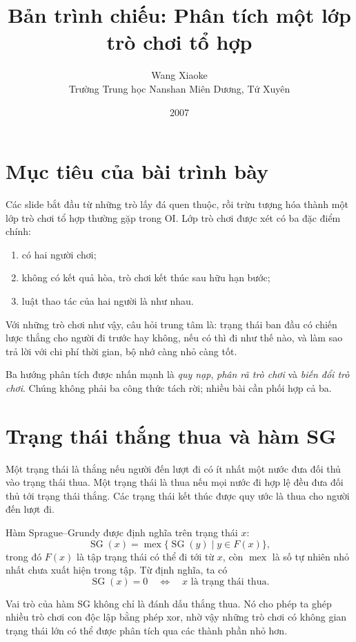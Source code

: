\documentclass[11pt]{article}
\title{Bản trình chiếu: Phân tích một lớp trò chơi tổ hợp}
\author{Wang Xiaoke\\Trường Trung học Nanshan Miên Dương, Tứ Xuyên}
\date{2007}
\newcommand{\SG}{\operatorname{SG}}
\newcommand{\mex}{\operatorname{mex}}
\begin{document}
\maketitle


\section{Mục tiêu của bài trình bày}

Các slide bắt đầu từ những trò lấy đá quen thuộc, rồi trừu tượng hóa thành
một lớp trò chơi tổ hợp thường gặp trong OI. Lớp trò chơi được xét có ba đặc
điểm chính:
\begin{enumerate}
  \item có hai người chơi;
  \item không có kết quả hòa, trò chơi kết thúc sau hữu hạn bước;
  \item luật thao tác của hai người là như nhau.
\end{enumerate}

Với những trò chơi như vậy, câu hỏi trung tâm là: trạng thái ban đầu có chiến
lược thắng cho người đi trước hay không, nếu có thì đi như thế nào, và làm sao
trả lời với chi phí thời gian, bộ nhớ càng nhỏ càng tốt.

Ba hướng phân tích được nhấn mạnh là \emph{quy nạp}, \emph{phân rã trò chơi}
và \emph{biến đổi trò chơi}. Chúng không phải ba công thức tách rời; nhiều bài
cần phối hợp cả ba.

\section{Trạng thái thắng thua và hàm SG}

Một trạng thái là thắng nếu người đến lượt đi có ít nhất một nước đưa đối thủ
vào trạng thái thua. Một trạng thái là thua nếu mọi nước đi hợp lệ đều đưa đối
thủ tới trạng thái thắng. Các trạng thái kết thúc được quy ước là thua cho
người đến lượt đi.

Hàm Sprague--Grundy được định nghĩa trên trạng thái \(x\):
\[
  \SG(x)=\mex\{\SG(y)\mid y\in F(x)\},
\]
trong đó \(F(x)\) là tập trạng thái có thể đi tới từ \(x\), còn \(\mex\) là số
tự nhiên nhỏ nhất chưa xuất hiện trong tập. Từ định nghĩa, ta có
\[
  \SG(x)=0 \quad\Longleftrightarrow\quad x\text{ là trạng thái thua}.
\]

Vai trò của hàm SG không chỉ là đánh dấu thắng thua. Nó cho phép ta ghép nhiều
trò chơi con độc lập bằng phép xor, nhờ vậy những trò chơi có không gian trạng
thái lớn có thể được phân tích qua các thành phần nhỏ hơn.
\end{document}
